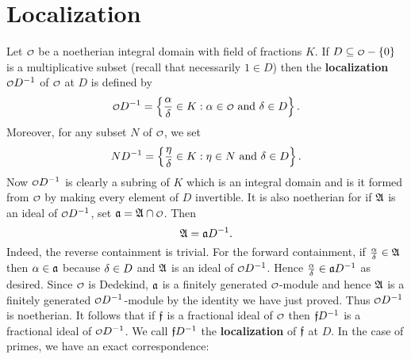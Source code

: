   \section{Localization}
    Let $\smc{O}$ be a noetherian integral domain with field of fractions $K$. If $D \subseteq \smc{O}-\{0\}$ is a multiplicative subset (recall that necessarily $1 \in D$) then the \textbf{localization} $\smc{O}D^{-1}$ of $\smc{O}$ at $D$ is defined by
    \[
      \smc{O}D^{-1} = \left\{\frac{\a}{\d} \in K:\text{$\a \in \smc{O}$ and $\d \in D$}\right\}.
    \]
    Moreover, for any subset $N$ of $\smc{O}$, we set
    \[
      ND^{-1} = \left\{\frac{\eta}{\delta} \in K:\text{$\eta \in N$ and $\delta \in D$}\right\}.
    \]
    Now $\smc{O}D^{-1}$ is clearly a subring of $K$ which is an integral domain and is it formed from $\smc{O}$ by making every element of $D$ invertible. It is also noetherian for if $\mathfrak{A}$ is an ideal of $\smc{O}D^{-1}$, set $\mf{a} = \mf{A} \cap \smc{O}$. Then
    \[
      \mathfrak{A} = \mathfrak{a}D^{-1}.
    \]
    Indeed, the reverse containment is trivial. For the forward containment, if $\frac{\alpha}{\delta} \in \mathfrak{A}$ then $\alpha \in \mathfrak{a}$ because $\delta \in D$ and $\mathfrak{A}$ is an ideal of $\smc{O}D^{-1}$. Hence $\frac{\alpha}{\delta} \in \mathfrak{a}D^{-1}$ as desired. Since $\smc{O}$ is Dedekind, $\mathfrak{a}$ is a finitely generated $\smc{O}$-module and hence $\mathfrak{A}$ is a finitely generated $\smc{O}D^{-1}$-module by the identity we have just proved. Thus $\smc{O}D^{-1}$ is noetherian. It follows that if $\mathfrak{f}$ is a fractional ideal of $\smc{O}$ then $\mathfrak{f}D^{-1}$ is a fractional ideal of $\smc{O}D^{-1}$. We call $\mathfrak{f}D^{-1}$ the \textbf{localization} of $\mathfrak{f}$ at $D$. In the case of primes, we have an exact correspondence:

